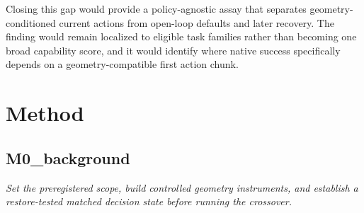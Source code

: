 \documentclass[10pt,a4paper]{article}
\begin{document}
Closing this gap would provide a policy-agnostic assay that separates geometry-conditioned current actions from open-loop defaults and later recovery. The finding would remain localized to eligible task families rather than becoming one broad capability score, and it would identify where native success specifically depends on a geometry-compatible first action chunk.
\section*{Method}
\subsection*{M0\_background}
\emph{Set the preregistered scope, build controlled geometry instruments, and establish a restore-tested matched decision state before running the crossover.}
\end{document}
